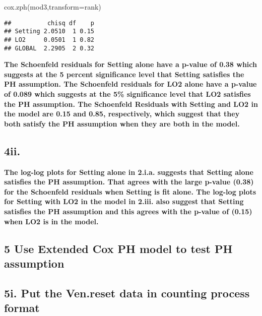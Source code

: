 \documentclass[
]{article}
\newenvironment{Shaded}{\begin{snugshade}}{\end{snugshade}}
\newcommand{\AttributeTok}[1]{\textcolor[rgb]{0.77,0.63,0.00}{#1}}
\newcommand{\FunctionTok}[1]{\textcolor[rgb]{0.00,0.00,0.00}{#1}}
\newcommand{\NormalTok}[1]{#1}
\begin{document}
\begin{Shaded}
\begin{Highlighting}[]
\FunctionTok{cox.zph}\NormalTok{(mod3,}\AttributeTok{transform=}\NormalTok{rank)}
\end{Highlighting}
\end{Shaded}

\begin{verbatim}
##          chisq df    p
## Setting 2.0510  1 0.15
## LO2     0.0501  1 0.82
## GLOBAL  2.2905  2 0.32
\end{verbatim}

\textbf{The Schoenfeld residuals for Setting alone have a p-value of
0.38 which suggests at the 5 percent significance level that Setting
satisfies the PH assumption. The Schoenfeld residuals for LO2 alone have
a p-value of 0.089 which suggests at the 5\% significance level that LO2
satisfies the PH assumption. The Schoenfeld Residuals with Setting and
LO2 in the model are 0.15 and 0.85, respectively, which suggest that
they both satisfy the PH assumption when they are both in the model. }

\hypertarget{ii.}{%
\subsection{4ii.}\label{ii.}}

\textbf{The log-log plots for Setting alone in 2.i.a. suggests that
Setting alone satisfies the PH assumption. That agrees with the large
p-value (0.38) for the Schoenfeld residuals when Setting is fit alone.
The log-log plots for Setting with LO2 in the model in 2.iii. also
suggest that Setting satisfies the PH assumption and this agrees with
the p-value of (0.15) when LO2 is in the model.}

\hypertarget{use-extended-cox-ph-model-to-test-ph-assumption}{%
\subsection{5 Use Extended Cox PH model to test PH
assumption}\label{use-extended-cox-ph-model-to-test-ph-assumption}}

\hypertarget{i.-put-the-ven.reset-data-in-counting-process-format}{%
\subsection{5i. Put the Ven.reset data in counting process
format}\label{i.-put-the-ven.reset-data-in-counting-process-format}}
\end{document}
